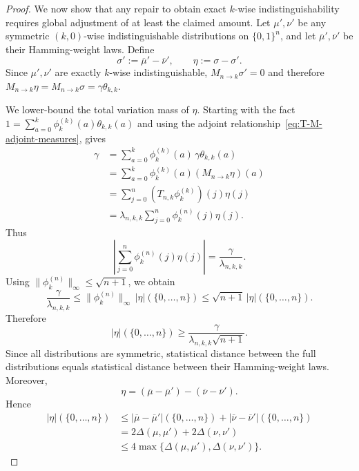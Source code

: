 \documentclass[manuscript,nonacm]{acmart}
\begin{document}
\begin{proof}
We now show that any repair to obtain exact \(k\)-wise indistinguishability requires global adjustment of at least the claimed amount. Let \(\mu',\nu'\) be any symmetric
\((k,0)\)-wise indistinguishable distributions on \(\{0,1\}^n\), and let
\(\overline{\mu}',\overline{\nu}'\) be their Hamming-weight laws. Define
\[
    \sigma':=\overline{\mu}'-\overline{\nu}',
    \qquad
    \eta:=\sigma-\sigma'.
\]
Since \(\mu',\nu'\) are exactly \(k\)-wise indistinguishable, $M_{n\to k}\sigma'=0$ and therefore $M_{n\to k}\eta=M_{n\to k}\sigma=\gamma\theta_{k,k}$.

We lower-bound the total variation mass of \(\eta\). Starting with the fact $1=\sum_{a=0}^k \phi_k^{(k)}(a)\theta_{k,k}(a)$ and using the
adjoint relationship~\eqref{eq:T-M-adjoint-measures}, gives
\[
\begin{aligned}
    \gamma
    &=
    \sum_{a=0}^k \phi_k^{(k)}(a)\,\gamma\theta_{k,k}(a)              \\
    &=
    \sum_{a=0}^k \phi_k^{(k)}(a)(M_{n\to k}\eta)(a)              \\
    &=
    \sum_{j=0}^n (T_{n,k}\phi_k^{(k)})(j)\eta(j)                 \\
    &=
    \lambda_{n,k,k}
    \sum_{j=0}^n \phi_k^{(n)}(j)\eta(j).
\end{aligned}
\]
Thus
\[
    \left|
        \sum_{j=0}^n \phi_k^{(n)}(j)\eta(j)
    \right|
    =
    \frac{\gamma}{\lambda_{n,k,k}}.
\]
Using $\|\phi_k^{(n)}\|_\infty\le \sqrt{n+1}$,
we obtain
\[
    \frac{\gamma}{\lambda_{n,k,k}}
    \le
    \|\phi_k^{(n)}\|_\infty\,|\eta|(\{0,\dots,n\})
    \le
    \sqrt{n+1}\,|\eta|(\{0,\dots,n\}).
\]
Therefore
\begin{equation}
\label{eq:eta-mass-lower-bound}
    |\eta|(\{0,\dots,n\})
    \ge
    \frac{\gamma}{\lambda_{n,k,k}\sqrt{n+1}}.
\end{equation}
Since all distributions are symmetric, statistical distance between the
full distributions equals statistical distance between their
Hamming-weight laws. Moreover,
\[
    \eta
    =
    (\overline{\mu}-\overline{\mu}')
    -
    (\overline{\nu}-\overline{\nu}').
\]
Hence
\[
\begin{aligned}
    |\eta|(\{0,\dots,n\})
    &\le
    |\overline{\mu}-\overline{\mu}'|(\{0,\dots,n\})
    +
    |\overline{\nu}-\overline{\nu}'|(\{0,\dots,n\})              \\
    &=
    2\Delta(\mu,\mu')
    +
    2\Delta(\nu,\nu')                                           \\
    &\le
    4\max\{\Delta(\mu,\mu'),\Delta(\nu,\nu')\}.

\end{aligned}\]
\end{proof}
\end{document}
